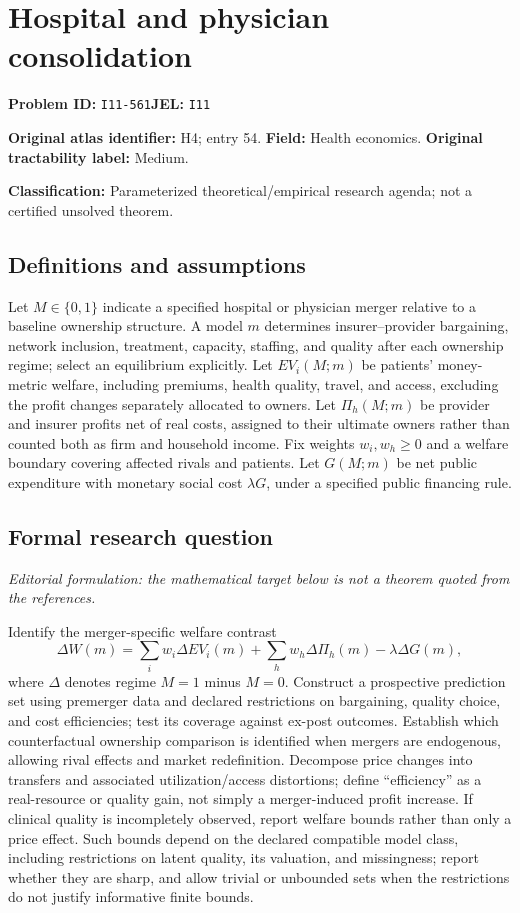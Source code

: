 \documentclass[11pt,a4paper]{article}
\begin{document}
\section*{Hospital and physician consolidation}
\textbf{Problem ID:} \texttt{I11-561}\quad \textbf{JEL:} \texttt{I11}\par
\label{problem:OP-0054}
\label{atlas:prob:H4}
\noindent\textbf{Original atlas identifier:} H4; entry 54. \textbf{Field:} Health economics. \textbf{Original tractability label:} Medium.

\noindent\textbf{Classification:} Parameterized theoretical/empirical research agenda; not a certified unsolved theorem.

\subsection*{Definitions and assumptions}
Let $M\in\{0,1\}$ indicate a specified hospital or physician merger relative to a baseline ownership structure. A model $m$ determines insurer--provider bargaining, network inclusion, treatment, capacity, staffing, and quality after each ownership regime; select an equilibrium explicitly. Let $EV_i(M;m)$ be patients' money-metric welfare, including premiums, health quality, travel, and access, excluding the profit changes separately allocated to owners. Let $\Pi_h(M;m)$ be provider and insurer profits net of real costs, assigned to their ultimate owners rather than counted both as firm and household income. Fix weights $w_i,w_h\geq0$ and a welfare boundary covering affected rivals and patients. Let $G(M;m)$ be net public expenditure with monetary social cost $\lambda G$, under a specified public financing rule.

\subsection*{Formal research question}
\emph{Editorial formulation: the mathematical target below is not a theorem quoted from the references.}

Identify the merger-specific welfare contrast
\[
 \Delta W(m)=\sum_iw_i\Delta EV_i(m)+\sum_hw_h\Delta\Pi_h(m)-\lambda\Delta G(m),
\]
where $\Delta$ denotes regime $M=1$ minus $M=0$. Construct a prospective prediction set using premerger data and declared restrictions on bargaining, quality choice, and cost efficiencies; test its coverage against ex-post outcomes. Establish which counterfactual ownership comparison is identified when mergers are endogenous, allowing rival effects and market redefinition. Decompose price changes into transfers and associated utilization/access distortions; define “efficiency” as a real-resource or quality gain, not simply a merger-induced profit increase. If clinical quality is incompletely observed, report welfare bounds rather than only a price effect. Such bounds depend on the declared compatible model class, including restrictions on latent quality, its valuation, and missingness; report whether they are sharp, and allow trivial or unbounded sets when the restrictions do not justify informative finite bounds.
\end{document}
